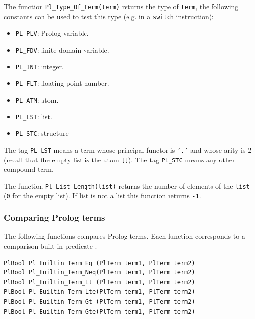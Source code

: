 The function \texttt{Pl\_Type\_Of\_Term(term)} returns the type of
\texttt{term}, the following constants can be used to test this type (e.g.
in a \texttt{switch} instruction):

\begin{itemize}
\item \texttt{PL\_PLV}: Prolog variable.

\item \texttt{PL\_FDV}: finite domain variable.

\item \texttt{PL\_INT}: integer.

\item \texttt{PL\_FLT}: floating point number.

\item \texttt{PL\_ATM}: atom.

\item \texttt{PL\_LST}: list.

\item \texttt{PL\_STC}: structure
\end{itemize}

The tag \texttt{PL\_LST} means a term whose principal functor is \texttt{'.'}
and whose arity is 2 (recall that the empty list is the atom \texttt{[]}).
The tag \texttt{PL\_STC} means any other compound term.

The function \texttt{Pl\_List\_Length(list)} returns the number of elements of
the \texttt{list} (\texttt{0} for the empty list). If list is not a list
this function returns \texttt{-1}.

\subsubsection{Comparing Prolog terms}

The following functions compares Prolog terms. Each function corresponds to
a comparison built-in predicate .

\begin{Code}
\begin{verbatim}
PlBool Pl_Builtin_Term_Eq (PlTerm term1, PlTerm term2)
PlBool Pl_Builtin_Term_Neq(PlTerm term1, PlTerm term2)
PlBool Pl_Builtin_Term_Lt (PlTerm term1, PlTerm term2)
PlBool Pl_Builtin_Term_Lte(PlTerm term1, PlTerm term2)
PlBool Pl_Builtin_Term_Gt (PlTerm term1, PlTerm term2)
PlBool Pl_Builtin_Term_Gte(PlTerm term1, PlTerm term2)
\end{verbatim}
\end{Code}

